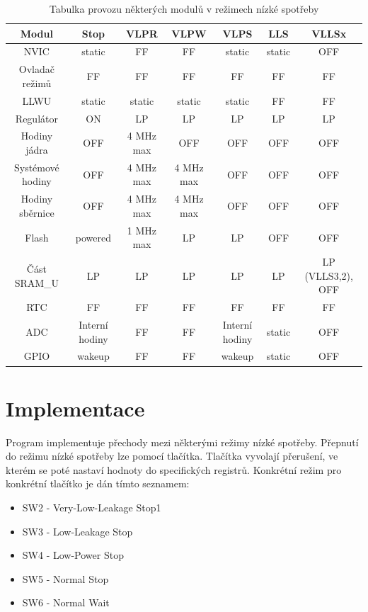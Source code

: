 \documentclass{article}
\begin{document}
\begin{table}[h]
\begin{adjustwidth}{-2.8cm}{1cm}
\begin{tabular}{ | c | c | c | c | c | c | c | }
    \hline
    \textbf{Modul} & \textbf{Stop} & \textbf{VLPR} & \textbf{VLPW} &
    \textbf{VLPS} & \textbf{LLS} & \textbf{VLLSx} \\
    \hline
    NVIC & static & FF & FF & static & static & OFF \\
    \hline
    Ovladač režimů & FF & FF & FF & FF & FF & FF \\
    \hline
    LLWU & static & static & static & static & FF & FF \\
    \hline
    Regulátor & ON & LP & LP & LP & LP & LP \\
    \hline
    Hodiny jádra & OFF & 4 MHz max & OFF & OFF & OFF & OFF \\
    \hline
    Systémové hodiny & OFF & 4 MHz max & 4 MHz max & OFF & OFF & OFF \\
    \hline
    Hodiny sběrnice & OFF & 4 MHz max & 4 MHz max & OFF & OFF & OFF \\
    \hline
    Flash & powered & 1 MHz max & LP & LP & OFF & OFF \\
    \hline
    Část SRAM\_U & LP & LP & LP & LP & LP & LP (VLLS3,2), OFF \\
    \hline
    RTC & FF & FF & FF & FF & FF & FF \\
    \hline
    ADC & Interní hodiny & FF & FF & Interní hodiny & static & OFF \\
    \hline
    GPIO & wakeup & FF & FF & wakeup & static & OFF \\
    \hline
\end{tabular}
\end{adjustwidth}
\caption{Tabulka provozu některých modulů v režimech nízké spotřeby}
\end{table}

\newpage
\section{Implementace}

Program implementuje přechody mezi některými režimy nízké spotřeby. Přepnutí
do režimu nízké spotřeby lze pomocí tlačítka. Tlačítka vyvolají přerušení,
ve kterém se poté nastaví hodnoty do specifických registrů. Konkrétní režim pro
konkrétní tlačítko je dán tímto seznamem:
\begin{itemize}
    \item SW2 - Very-Low-Leakage Stop1
    \item SW3 - Low-Leakage Stop
    \item SW4 - Low-Power Stop
    \item SW5 - Normal Stop
    \item SW6 - Normal Wait
\end{itemize}
\end{document}
